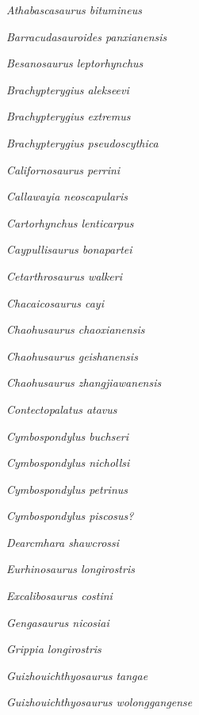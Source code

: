 \emph{Athabascasaurus bitumineus}~

\emph{Barracudasauroides panxianensis}~

\emph{Besanosaurus leptorhynchus}~

\emph{Brachypterygius alekseevi}~

\emph{Brachypterygius extremus}~

\emph{Brachypterygius pseudoscythica}~

\emph{Californosaurus perrini}~

\emph{Callawayia neoscapularis}~

\emph{Cartorhynchus lenticarpus}~

\emph{Caypullisaurus bonapartei}~

\emph{Cetarthrosaurus walkeri}~

\emph{Chacaicosaurus cayi}~

\emph{Chaohusaurus chaoxianensis}~

\emph{Chaohusaurus geishanensis}~

\emph{Chaohusaurus zhangjiawanensis}~

\emph{Contectopalatus atavus}~

\emph{Cymbospondylus buchseri}~

\emph{Cymbospondylus nichollsi}~

\emph{Cymbospondylus petrinus}~

\emph{Cymbospondylus piscosus?}~

\emph{Dearcmhara shawcrossi}~

\emph{Eurhinosaurus longirostris}~

\emph{Excalibosaurus costini}~

\emph{Gengasaurus nicosiai}~

\emph{Grippia longirostris}~

\emph{Guizhouichthyosaurus tangae}~

\emph{Guizhouichthyosaurus wolonggangense}~

